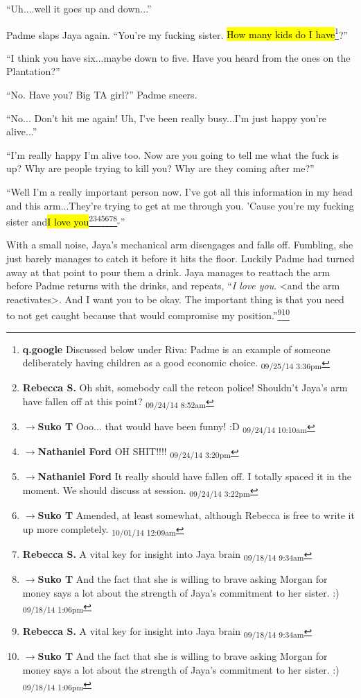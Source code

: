 ``Uh....well it goes up and down...''

Padme slaps Jaya again.  ``You're my fucking sister.  \hl{How many kids do I have}\footnote{\textbf{q.google }Discussed below under Riva: Padme is an example of someone deliberately having children as a good economic choice. \textsubscript{09/25/14 3:36pm}}?''

``I think you have six...maybe down to five.  Have you heard from the ones on the Plantation?''

``No.  Have you?  Big TA girl?'' Padme sneers.

``No... Don't hit me again!  Uh, I've been really busy...I'm just happy you're alive...''

``I'm really happy I'm alive too.  Now are you going to tell me what the fuck is up? Why are people trying to kill you?  Why are they coming after me?''

``Well I'm a really important person now.  I've got all this information in my head and this arm...They're trying to get at me through you.  'Cause you're my fucking sister and\hl{I love you}\footnote{\textbf{Rebecca S. }Oh shit, somebody call the retcon police! Shouldn't Jaya's arm have fallen off at this point? \textsubscript{09/24/14 8:52am}}\footnote{$\rightarrow$\textbf{Suko T }Ooo... that would have been funny! :D \textsubscript{09/24/14 10:10am}}\footnote{$\rightarrow$\textbf{Nathaniel Ford }OH SHIT!!!! \textsubscript{09/24/14 3:20pm}}\footnote{$\rightarrow$\textbf{Nathaniel Ford }It really should have fallen off. I totally spaced it in the moment. We should discuss at session. \textsubscript{09/24/14 3:22pm}}\footnote{$\rightarrow$\textbf{Suko T }Amended, at least somewhat, although Rebecca is free to write it up more completely. \textsubscript{10/01/14 12:09am}}\footnote{\textbf{Rebecca S. }A vital key for insight into Jaya brain \textsubscript{09/18/14 9:34am}}\footnote{$\rightarrow$\textbf{Suko T }And the fact that she is willing to brave asking Morgan for money says a lot about the strength of Jaya's commitment to her sister. :) \textsubscript{09/18/14 1:06pm}}-''

With a small noise, Jaya's mechanical arm disengages and falls off.  Fumbling, she just barely manages to catch it before it hits the floor.  Luckily Padme had turned away at that point to pour them a drink.  Jaya manages to reattach the arm before Padme returns with the drinks, and repeats,  ``\textit{I love you}. \textless and the arm reactivates\textgreater .  And I want you to be okay.  The important thing is that you need to not get caught because that would compromise my position.''\footnote{\textbf{Rebecca S. }A vital key for insight into Jaya brain \textsubscript{09/18/14 9:34am}}\footnote{$\rightarrow$\textbf{Suko T }And the fact that she is willing to brave asking Morgan for money says a lot about the strength of Jaya's commitment to her sister. :) \textsubscript{09/18/14 1:06pm}}

